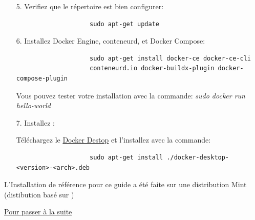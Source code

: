 \documentclass[internal]{nhitec_design}
\begin{document}
\begin{itemize}
            \item[5.] Verifiez que le répertoire est bien configurer:

                \begin{lstlisting}
                    sudo apt-get update
                \end{lstlisting}    

            \item[6.] Installez Docker Engine, conteneurd, et Docker Compose:

                \begin{lstlisting}
                    sudo apt-get install docker-ce docker-ce-cli 
                    conteneurd.io docker-buildx-plugin docker-compose-plugin
                \end{lstlisting}
                \begin{footnotesize}
                    Vous pouvez tester votre installation avec la commande: \textit{sudo docker run hello-world}
                \end{footnotesize}

                \bigskip
            \item[7.] Installez \dockerdesktop{}:

            
                \begin{footnotesize}
                    Téléchargez le \href{https://desktop.docker.com/linux/main/amd64/docker-desktop-4.17.0-amd64.deb?utm_source=docker&utm_medium=webreferral&utm_campaign=docs-driven-download-linux-amd64}{Docker Destop} et l'installez avec la commande:
                \end{footnotesize}

                \begin{lstlisting}
                    sudo apt-get install ./docker-desktop-<version>-<arch>.deb
                \end{lstlisting}

        \end{itemize}

\bigskip

        \begin{footnotesize}
            L'Installation de référence pour ce guide a été faite sur une distribution \linux{} Mint (distibution basé sur \ubuntu{})\\
        \end{footnotesize}

        \hyperref[sec:suite]{Pour passer à la suite}
\end{document}

